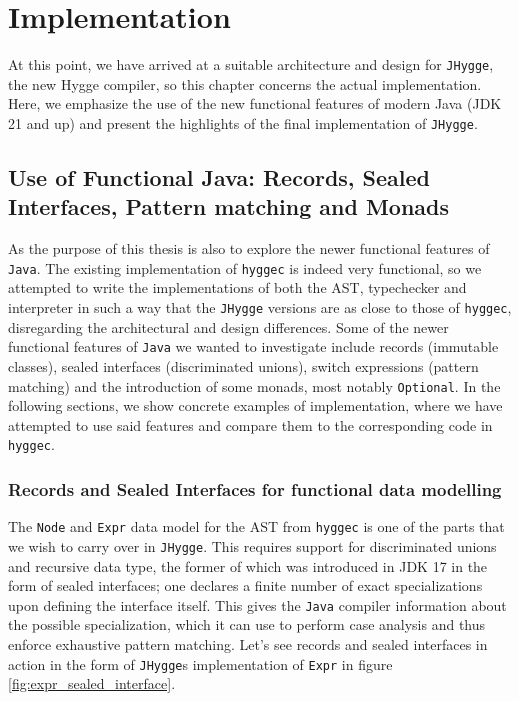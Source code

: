 \chapter{Implementation}

At this point, we have arrived at a suitable architecture and design for \texttt{JHygge}, the new Hygge compiler, so this chapter concerns the actual
implementation. Here, we emphasize the use of the new functional features of modern Java (JDK 21 and up) and present the highlights
of the final implementation of \texttt{JHygge}. 

\section{Use of Functional Java: Records, Sealed Interfaces, Pattern matching and Monads}

As the purpose of this thesis is also to explore the newer functional features of \texttt{Java}. The existing implementation of \texttt{hyggec}
is indeed very functional, so we attempted to write the implementations of both the AST, typechecker and interpreter in such a way that
the \texttt{JHygge} versions are as close to those of \texttt{hyggec}, disregarding the architectural and design differences. Some of
the newer functional features of \texttt{Java} we wanted to investigate include records (immutable classes), sealed interfaces (discriminated unions),
switch expressions (pattern matching) and the introduction of some monads, most notably \texttt{Optional}. In the following sections,
we show concrete examples of implementation, where we have attempted to use said features and compare them to the corresponding code
in \texttt{hyggec}.

\subsection{Records and Sealed Interfaces for functional data modelling}

The \texttt{Node} and \texttt{Expr} data model for the AST from \texttt{hyggec} is one of the parts that we wish to carry over in \texttt{JHygge}.
This requires support for discriminated unions and recursive data type, the former of which was introduced in JDK 17 in the form of sealed
interfaces; one declares a finite number of exact specializations upon defining the interface itself. This gives the \texttt{Java} compiler
information about the possible specialization, which it can use to perform case analysis and thus enforce exhaustive pattern matching. Let's
see records and sealed interfaces in action in the form of \texttt{JHygge}s implementation of \texttt{Expr} in figure \ref{fig:expr_sealed_interface}.

